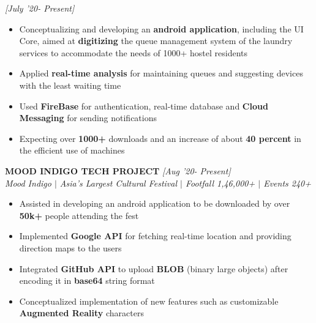 \documentclass[10pt]{article}
\begin{document}
\hfill{\sl \small [July '20- Present]}
\vspace{-8pt}
\begin{itemize}[itemsep = -1.6mm]
   \item{Conceptualizing and developing an \textbf{android application}, including the UI Core, aimed  at \textbf{digitizing} the queue management system of the laundry services to accommodate the needs of 1000+ hostel residents  }
   \item Applied \textbf{real-time analysis} for maintaining  queues and suggesting devices with the least waiting time
   \item Used \textbf{FireBase} for authentication, real-time database and \textbf{Cloud Messaging} for sending notifications
   \item{Expecting over \textbf{1000+} downloads and an increase of about \textbf{40 percent} in the efficient use of machines}
\end{itemize}
\vspace{-7pt}
\hspace{-7pt}
\noindent \textbf{ MOOD INDIGO TECH PROJECT} \hfill{\sl \small [Aug '20- Present]}\\
{\it Mood Indigo $|$ Asia's Largest Cultural Festival $|$ Footfall 1,46,000+ $|$ Events 240+} \hfill{\sl \small }\\
\vspace{-19pt}
\begin{itemize}[itemsep = -1.6mm]
   \item Assisted in  developing an android application to be downloaded by over \textbf{50k+} people attending the fest
   \item Implemented \textbf{Google API} for fetching real-time location and providing direction maps to the users
   \item Integrated \textbf{GitHub API} to upload \textbf{BLOB} (binary large objects) after encoding it in \textbf{base64} string format
   \item Conceptualized implementation of new features such as customizable \textbf{Augmented Reality} characters
\end{itemize}
\end{document}
